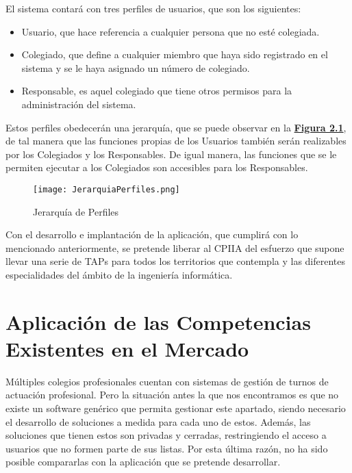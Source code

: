 El sistema contará con tres perfiles de usuarios, que son los siguientes:
\begin{itemize}
	\item Usuario, que hace referencia a cualquier persona que no esté colegiada.
	\item Colegiado, que define a cualquier miembro que haya sido registrado en el sistema y se le haya asignado un número de colegiado.
	\item Responsable, es aquel colegiado que tiene otros permisos para la administración del sistema.
\end{itemize}


Estos perfiles obedecerán una jerarquía, que se puede observar en la \textbf{\hyperref[fig:jerarquiaPerfiles]{Figura 2.1}}, de tal manera que las funciones propias de los Usuarios también serán realizables por los Colegiados y los Responsables. De igual manera, las funciones que se le permiten ejecutar a los Colegiados son accesibles para los Responsables.

\begin{figure}[!htbp]
  \centering
  \texttt{[image: JerarquiaPerfiles.png]}
  \caption{Jerarquía de Perfiles}
  \label{fig:jerarquiaPerfiles}
\end{figure}
\FloatBarrier

Con el desarrollo e implantación de la aplicación, que cumplirá con lo mencionado anteriormente, se pretende liberar al CPIIA del esfuerzo que supone llevar una serie de TAPs para todos los territorios que contempla y las diferentes especialidades del ámbito de la ingeniería informática.


\section{Aplicación de las Competencias Existentes en el Mercado}
Múltiples colegios profesionales cuentan con sistemas de gestión de turnos de actuación profesional. Pero la situación antes la que nos encontramos es que no existe un software genérico que permita gestionar este apartado, siendo necesario el desarrollo de soluciones a medida para cada uno de estos. Además, las soluciones que tienen estos son privadas y cerradas, restringiendo el acceso a usuarios que no formen parte de sus listas. Por esta última razón, no ha sido posible compararlas con la aplicación que se pretende desarrollar.
